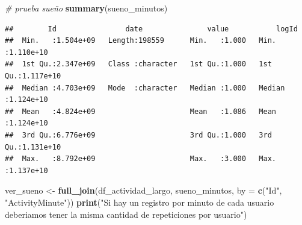 \documentclass[
]{article}
\newenvironment{Shaded}{\begin{snugshade}}{\end{snugshade}}
\newcommand{\AttributeTok}[1]{\textcolor[rgb]{0.13,0.29,0.53}{#1}}
\newcommand{\CommentTok}[1]{\textcolor[rgb]{0.56,0.35,0.01}{\textit{#1}}}
\newcommand{\FunctionTok}[1]{\textcolor[rgb]{0.13,0.29,0.53}{\textbf{#1}}}
\newcommand{\NormalTok}[1]{#1}
\newcommand{\OtherTok}[1]{\textcolor[rgb]{0.56,0.35,0.01}{#1}}
\newcommand{\SpecialCharTok}[1]{\textcolor[rgb]{0.81,0.36,0.00}{\textbf{#1}}}
\newcommand{\StringTok}[1]{\textcolor[rgb]{0.31,0.60,0.02}{#1}}
\begin{document}
\begin{Shaded}
\begin{Highlighting}[]
\CommentTok{\# prueba sueño}
\FunctionTok{summary}\NormalTok{(sueno\_minutos)}
\end{Highlighting}
\end{Shaded}

\begin{verbatim}
##        Id                date               value           logId          
##  Min.   :1.504e+09   Length:198559      Min.   :1.000   Min.   :1.110e+10  
##  1st Qu.:2.347e+09   Class :character   1st Qu.:1.000   1st Qu.:1.117e+10  
##  Median :4.703e+09   Mode  :character   Median :1.000   Median :1.124e+10  
##  Mean   :4.824e+09                      Mean   :1.086   Mean   :1.124e+10  
##  3rd Qu.:6.776e+09                      3rd Qu.:1.000   3rd Qu.:1.131e+10  
##  Max.   :8.792e+09                      Max.   :3.000   Max.   :1.137e+10
\end{verbatim}

\begin{Shaded}
\end{Shaded}

\begin{Shaded}
\begin{Highlighting}[]
\NormalTok{ver\_sueno }\OtherTok{\textless{}{-}} \FunctionTok{full\_join}\NormalTok{(df\_actividad\_largo, sueno\_minutos, }\AttributeTok{by =} \FunctionTok{c}\NormalTok{(}\StringTok{"Id"}\NormalTok{, }\StringTok{"ActivityMinute"}\NormalTok{))}
\FunctionTok{print}\NormalTok{(}\StringTok{"Si hay un registro por minuto de cada usuario deberiamos tener la misma cantidad de repeticiones por usuario"}\NormalTok{)}
\end{Highlighting}
\end{Shaded}
\end{document}
